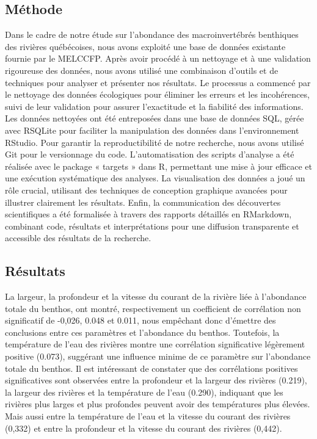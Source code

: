 \documentclass[9pt,twocolumn,twoside,]{pnas-new}
\begin{document}
\hypertarget{Muxe9thode}{%
\subsection*{Méthode}\label{Muxe9thode}}

Dans le cadre de notre étude sur l'abondance des macroinvertébrés
benthiques des rivières québécoises, nous avons exploité une base de
données existante fournie par le MELCCFP. Après avoir procédé à un
nettoyage et à une validation rigoureuse des données, nous avons utilisé
une combinaison d'outils et de techniques pour analyser et présenter nos
résultats. Le processus a commencé par le nettoyage des données
écologiques pour éliminer les erreurs et les incohérences, suivi de leur
validation pour assurer l'exactitude et la fiabilité des informations.
Les données nettoyées ont été entreposées dans une base de données SQL,
gérée avec RSQLite pour faciliter la manipulation des données dans
l'environnement RStudio. Pour garantir la reproductibilité de notre
recherche, nous avons utilisé Git pour le versionnage du code.
L'automatisation des scripts d'analyse a été réalisée avec le package «
targets » dans R, permettant une mise à jour efficace et une exécution
systématique des analyses. La visualisation des données a joué un rôle
crucial, utilisant des techniques de conception graphique avancées pour
illustrer clairement les résultats. Enfin, la communication des
découvertes scientifiques a été formalisée à travers des rapports
détaillés en RMarkdown, combinant code, résultats et interprétations
pour une diffusion transparente et accessible des résultats de la
recherche.

\hypertarget{Ruxe9sultats}{%
\subsection*{Résultats}\label{Ruxe9sultats}}

La largeur, la profondeur et la vitesse du courant de la rivière liée à
l'abondance totale du benthos, ont montré, respectivement un coefficient
de corrélation non significatif de -0,026, 0.048 et 0.011, nous
empêchant donc d'émettre des conclusions entre ces paramètres et
l'abondance du benthos. Toutefois, la température de l'eau des rivières
montre une corrélation significative légèrement positive (0.073),
suggérant une influence minime de ce paramètre sur l'abondance totale du
benthos. Il est intéressant de constater que des corrélations positives
significatives sont observées entre la profondeur et la largeur des
rivières (0.219), la largeur des rivières et la température de l'eau
(0.290), indiquant que les rivières plus larges et plus profondes
peuvent avoir des températures plus élevées. Mais aussi entre la
température de l'eau et la vitesse du courant des rivières (0,332) et
entre la profondeur et la vitesse du courant des rivières (0,442).
\end{document}
